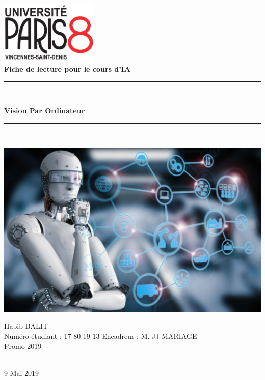 \begin{titlepage}
  \begin{center}
	\includegraphics[height=3cm]{img1.png} \\[3cm]
    \textbf{ \Large Fiche de lecture pour le cours d'IA}\\[0.5cm]
    {\rule{\linewidth}{0.5mm} \\[0.4cm]}
    { \huge \bfseries Vision Par Ordinateur\\[0.4cm] }
    {\rule{\linewidth}{0.5mm}\\[1cm]}
    \includegraphics[scale=0.3]{img2.png}
    \vfill   
	\begin{minipage}{0.4\textwidth}
      \begin{center}
         \begin{flushleft}
      		Habib BALIT\\
      		Numéro étudiant : 17 80 19 13
        		{Encadreur :} M. JJ MARIAGE\\
      		Promo 2019
      	\end{flushleft}
      \end{center}
    \end{minipage}
    \\[1cm]{\large 9 Mai 2019}
  \end{center}
\end{titlepage}